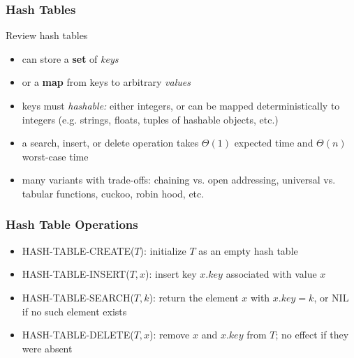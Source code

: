 \documentclass[10pt]{beamer}
\begin{document}

\begin{frame} \frametitle{Hash Tables}
Review hash tables
\begin{itemize}
  \item can store a \textbf{set} of \emph{keys}
  \item or a \textbf{map} from keys to arbitrary \emph{values}
  \item keys must \emph{hashable:} either integers, or can be mapped deterministically
    to integers (e.g. strings, floats, tuples of hashable objects, etc.)
  \item a search, insert, or delete operation takes $\Theta(1)$ expected time and
    $\Theta(n)$ worst-case time
  \item many variants with trade-offs: chaining vs. open addressing, universal vs.
    tabular functions, cuckoo, robin hood, etc.
\end{itemize}
\end{frame}

\begin{frame} \frametitle{Hash Table Operations}
  \begin{itemize}
  \item HASH-TABLE-CREATE($T$): initialize $T$ as an empty hash table
    \item HASH-TABLE-INSERT($T, x$): insert key $x.key$ associated with value $x$ 
    \item HASH-TABLE-SEARCH($T, k$): return the element $x$ with $x.key=k$, or NIL if no such element exists
    \item HASH-TABLE-DELETE($T, x$): remove $x$ and $x.key$ from $T$; no effect if they were absent
  \end{itemize}
  \end{frame}
\end{document}
